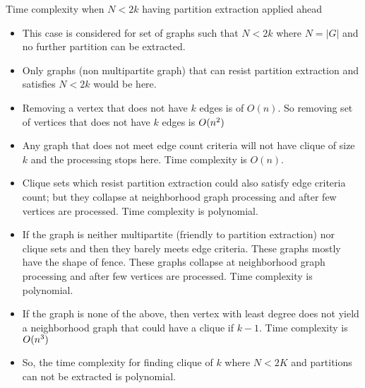 \documentclass[landscape]{slides}
\begin{document}
\begin{slide}
	\begin{center}{\large Time complexity when $N < 2k$ having partition extraction applied ahead}\end{center}
	\small
	\begin{itemize}
		\setlength{\itemsep}{0pt}
		\setlength{\parskip}{20pt}
		\setlength{\parsep}{0pt}
		\item This case is considered for set of graphs such that $N < 2k$ where $N = |G|$ and no further partition can be extracted.
		\item Only graphs (non multipartite graph) that can resist partition extraction and satisfies $N < 2k$ would be here.
		\item Removing a vertex that does not have $k$ edges is of $O(n)$. So removing set of vertices that does not have $k$ edges is $O(n\textsuperscript{2})$
		\item Any graph that does not meet edge count criteria will not have clique of size $k$ and the processing stops here. Time complexity is $O(n)$.
		\item Clique sets which resist partition extraction could also satisfy edge criteria count; but they collapse at neighborhood graph processing and after few vertices are processed. Time complexity is polynomial.
		\item If the graph is neither multipartite (friendly to partition extraction) nor clique sets and then they barely meets edge criteria. These graphs mostly have the shape of fence. These graphs collapse at neighborhood graph processing and after few vertices are processed. Time complexity is polynomial.
		\item If the graph is none of the above, then vertex with least degree does not yield a neighborhood graph that could have a clique if $k - 1$. Time complexity is $O(n\textsuperscript{3})$
		\item So, the time complexity for finding clique of $k$ where $N < 2K$ and partitions can not be extracted is polynomial.
	\end{itemize}
\end{slide}
\end{document}
